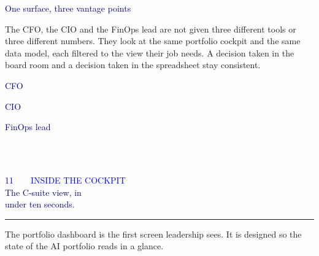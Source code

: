 \documentclass[10pt]{article}
\newcommand{\bodysize}{\fontsize{9.6}{15.2}\selectfont}
\newcommand{\sectionhead}[3]{%
  {\semibold\fontsize{8}{8}\selectfont\textcolor{blue}{#1\ \ \textbullet\ \ \MakeUppercase{#2}}}\\[5pt]
  {\black\fontsize{25}{28}\selectfont\textcolor{navy}{#3}}\\[6pt]
  {\color{blue}\rule{40pt}{2.8pt}}\par\vspace{14pt}}
\newcommand{\body}[1]{{\bodysize\textcolor{ink}{#1}\par}}
\newcommand{\lead}[1]{{\medium\fontsize{11.5}{16}\selectfont\textcolor{slate}{#1}\par}}
\begin{document}
\vspace{20pt}
{\heavy\fontsize{13}{16}\selectfont\textcolor{navy}{One surface, three vantage points}}\par
\vspace{10pt}
\body{The CFO, the CIO and the FinOps lead are not given three different tools or three different numbers. They look at the same portfolio cockpit and the same data model, each filtered to the view their job needs. A decision taken in the board room and a decision taken in the spreadsheet stay consistent.}
\vspace{18pt}

\newcommand{\rolerow}[2]{%
{\heavy\fontsize{9.6}{12}\selectfont\textcolor{navy}{#1}}\hspace{6pt}{\fontsize{8.5}{12.4}\selectfont\textcolor{slate}{#2}}\par
\vspace{6pt}{\color{linegray}\rule{\linewidth}{0.6pt}}\par\vspace{8pt}}
\rolerow{CFO}{Defends the AI line item with a booked, auditable number.}
\rolerow{CIO}{Lands the program by reading spend and readiness together.}
\rolerow{FinOps lead}{Operates the portfolio day to day, down to the column level.}

\vspace{6pt}
\begin{blueblock}
{\bodysize\textcolor{white}{Designed for three jobs. Worked around for none. Every role draws on the same answer.}}
\end{blueblock}
\newpage

\sectionhead{11}{Inside the Cockpit}{The C-suite view, in\\under ten seconds.}

\lead{The portfolio dashboard is the first screen leadership sees. It is designed so the state of the AI portfolio reads in a glance.}
\vspace{16pt}

\newcommand{\kpi}[2]{%
\begin{tcolorbox}[enhanced,colback=navy,colframe=navy,boxrule=0pt,arc=3pt,
  left=11pt,right=11pt,top=10pt,bottom=11pt]
\raggedright
{\heavy\fontsize{10}{12}\selectfont\textcolor{white}{#1}}\\[3pt]
{\fontsize{7.9}{10.8}\selectfont\textcolor{linegray}{#2}}
\end{tcolorbox}}
\end{document}
